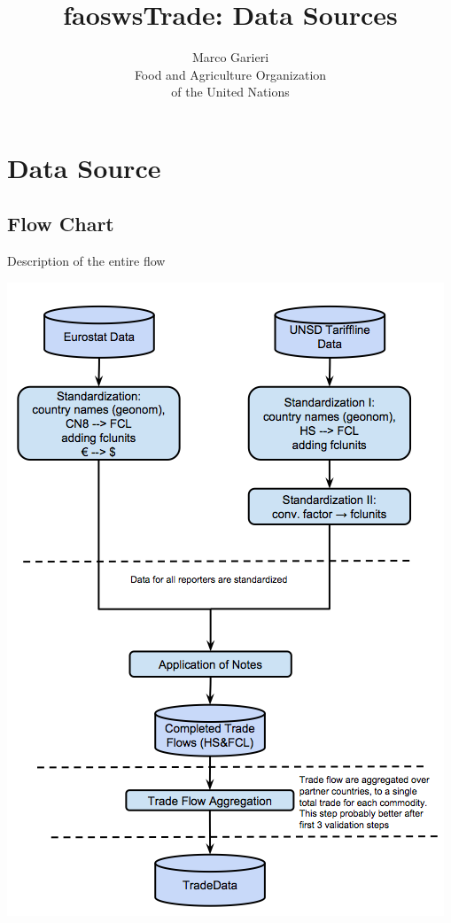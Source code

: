 \documentclass[nojss]{jss}\usepackage[]{graphicx}\usepackage[]{color}
\title{\bf faoswsTrade: Data Sources}
\author{Marco Garieri \\ Food and Agriculture Organization \\ of
  the United Nations}
\begin{document}
\newpage

%

\section{Data Source}
\subsection{Flow Chart}
Description of the entire flow
\begin{center}\includegraphics[scale = 0.01]{"trade_1"}\end{center}
\end{document}
